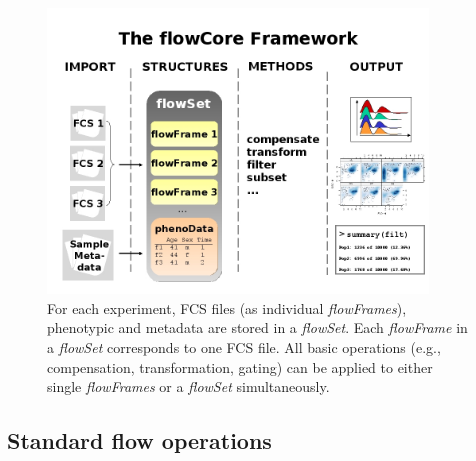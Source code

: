 \documentclass[12pt]{article}
\newcommand{\Rclass}[1]{{\textit{#1}}}
\begin{document}
\begin{figure}
\centering
\includegraphics[width=0.9\textwidth]{Figure1-flowCoreFrameWork.jpg}
\caption{\label{fig1:FrameWork}{For each experiment, FCS files (as
    individual \Rclass{flowFrames}), phenotypic and metadata are
    stored in a \Rclass{flowSet}. Each \Rclass{flowFrame} in a
    \Rclass{flowSet} corresponds to one FCS file. All basic operations
    (e.g., compensation, transformation, gating) can be applied to
    either single \Rclass{flowFrames} or a \Rclass{flowSet}
    simultaneously.}}
\end{figure}




\subsection*{Standard flow operations}
\end{document}
